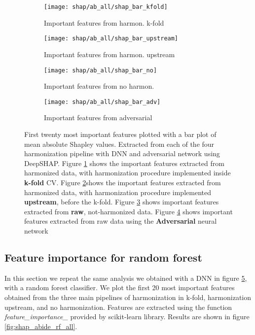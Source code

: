 \documentclass[11pt]{report}
\begin{document}
\begin{figure}[h!]
\centering
\begin{subfigure}[c]{.45\linewidth}
  \texttt{[image: shap/ab\_all/shap\_bar\_kfold]}
   \caption{Important features from harmon. k-fold}
   \label{fig:shap_bar_kfold_}
\end{subfigure}
\begin{subfigure}[c]{.45\textwidth}
   \texttt{[image: shap/ab\_all/shap\_bar\_upstream]}
   \caption{Important features from harmon. upstream}
     \label{fig:shap_abide_all_up}
\end{subfigure}
\hspace{3mm}
\begin{subfigure}[c]{.45\textwidth}
   \texttt{[image: shap/ab\_all/shap\_bar\_no]}
   \caption{Important features from no harmon.}
     \label{fig:shap_abide_all_no}
\end{subfigure}
\begin{subfigure}[c]{.45\textwidth}
   \texttt{[image: shap/ab\_all/shap\_bar\_adv]}
   \caption{Important features from adversarial}
   \label{fig:shap_abide_all_adv}
\end{subfigure}
\caption{First twenty most important features plotted with a bar plot of mean absolute Shapley values. Extracted from each of the four harmonization pipeline with DNN and adversarial network using DeepSHAP.
Figure \ref{fig:shap_bar_kfold_} shows the important features extracted from harmonized data, with harmonization procedure implemented inside \textbf{k-fold} CV.
Figure \ref{fig:shap_abide_all_up}shows the important features extracted from harmonized data, with harmonization procedure implemented \textbf{upstream}, before the k-fold.
Figure \ref{fig:shap_abide_all_no} shows important features extracted from \textbf{raw}, not-harmonized data.
Figure \ref{fig:shap_abide_all_adv} shows important features extracted from raw data using the \textbf{Adversarial} neural network
}
\label{fig:shap_abide_all} 

\end{figure}





\subsection{Feature importance for random forest}\label{sec:feature_importance_rf}
In this section we repeat the same analysis we obtained with a DNN in figure \ref{fig:shap_abide_all}, with a random forest classifier.
We plot the first 20 most important features obtained from the three main pipelines of harmonization in k-fold, harmonization upstream, and no harmonization.
Features are extracted using the function \emph{feature\_importance\_} provided by scikit-learn library.
Results are shown in figure \ref{fig:shap_abide_rf_all}. 
\end{document}
